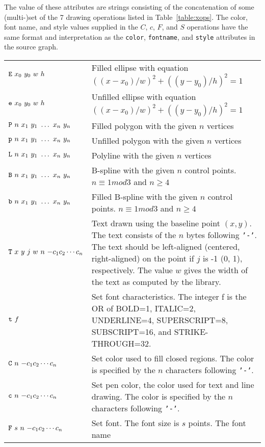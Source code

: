 The value of these attributes are strings consisting of the concatenation of 
some (multi-)set of the 7 drawing operations listed in Table~\ref{table:xops}. 
The color, font name, and style values supplied in the $C$, $c$, $F$,
and $S$ operations have the same format and interpretation
as the {\tt color}, {\tt fontname}, and
{\tt style} attributes in the source graph.
\begin{table}[htb]
\centering
\begin{tabular}[t]{|lp{4.5in}|} \hline
${\tt E}\ x_0\ y_0\ w\ h$ &  Filled ellipse with equation
$((x - x_0)/w)^2 + ((y - y_0)/h)^2 = 1$ \\
${\tt e}\ x_0\ y_0\ w\ h$ & Unfilled ellipse with equation
$((x - x_0)/w)^2 + ((y - y_0)/h)^2 = 1$ \\
${\tt P}\ n\ x_1\ y_1\ \ldots\ x_n\ y_n$ & Filled polygon with the
given $n$ vertices \\
${\tt p}\ n\ x_1\ y_1\ \ldots\ x_n\ y_n$ & Unfilled polygon with the
given $n$ vertices \\
${\tt L}\ n\ x_1\ y_1\ \ldots\ x_n\ y_n$ & Polyline with the
given $n$ vertices \\
${\tt B}\ n\ x_1\ y_1\ \ldots\ x_n\ y_n$ & B-spline with the
given $n$ control points. $n \equiv 1 mod 3$ and $n \geq 4$ \\
${\tt b}\ n\ x_1\ y_1\ \ldots\ x_n\ y_n$ & Filled B-spline with the
given $n$ control points. $n \equiv 1 mod 3$ and $n \geq 4$ \\
${\tt T}\ x\ y\ j\ w\ n\ {\tt -}c_{1}c_{2}\cdots c_{n}$ &
Text drawn using the baseline point $(x,y)$. The text consists of the 
$n$ bytes following {\tt '-'}. The text should be left-aligned (centered,
right-aligned) on the point if $j$ is -1 (0, 1), respectively. The 
value $w$ gives the width of the text as computed by the library.  \\
${\tt t}\ f$ &
Set font characteristics. The integer f is the OR of BOLD=1, ITALIC=2, UNDERLINE=4, SUPERSCRIPT=8, SUBSCRIPT=16, and STRIKE-THROUGH=32. \\
${\tt C}\ n\ {\tt -}c_{1}c_{2}\cdots c_{n}$ & Set color used to fill closed
regions. The
color is specified by the $n$ characters following {\tt '-'}. \\
${\tt c}\ n\ {\tt -}c_{1}c_{2}\cdots c_{n}$ & Set pen color, the color used
for text and line drawing. The
color is specified by the $n$ characters following {\tt '-'}. \\
${\tt F}\ s\ n\ {\tt -}c_{1}c_{2}\cdots c_{n}$ & Set font. The font
size is $s$ points. The font name

\end{tabular}
\end{table}
